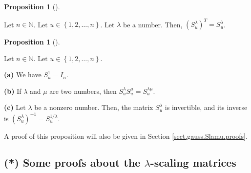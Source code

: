 \documentclass[numbers=enddot,12pt,final,onecolumn,notitlepage]{scrartcl}%
\theoremstyle{definition}
\newtheorem{prop}[theo]{Proposition}
\newenvironment{proposition}[1][]
{\begin{prop}[#1]\begin{leftbar}}
{\end{leftbar}\end{prop}}
\begin{document}
\begin{proposition}
\label{prop.Slamu.transpose}Let $n\in\mathbb{N}$. Let $u\in\left\{
1,2,\ldots,n\right\}  $. Let $\lambda$ be a number. Then, $\left(
S_{u}^{\lambda}\right)  ^{T}=S_{u}^{\lambda}$.
\end{proposition}

\begin{proposition}
\label{prop.Slamu.lambda+mu}Let $n\in\mathbb{N}$. Let $u\in\left\{
1,2,\ldots,n\right\}  $.

\textbf{(a)} We have $S_{u}^{1}=I_{n}$.

\textbf{(b)} If $\lambda$ and $\mu$ are two numbers, then $S_{u}^{\lambda
}S_{u}^{\mu}=S_{u}^{\lambda\mu}$.

\textbf{(c)} Let $\lambda$ be a nonzero number. Then, the matrix
$S_{u}^{\lambda}$ is invertible, and its inverse is $\left(  S_{u}^{\lambda
}\right)  ^{-1}=S_{u}^{1/\lambda}$.
\end{proposition}

A proof of this proposition will also be given in Section
\ref{sect.gauss.Slamu.proofs}.

\subsection{\label{sect.gauss.Slamu.proofs}(*) Some proofs about the $\lambda
$-scaling matrices}
\end{document}
